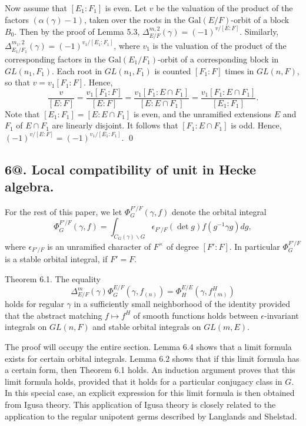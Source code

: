 \documentclass{amsart}
\begin{document}
Now assume that $[E_1:F_1]$ is even.  Let $v$ be the valuation of
the product of the factors $(\alpha(\gamma)-1)$, taken over the
roots in the $\text{Gal}(E/F)$-orbit of a block $B_0$.  Then by the
proof of Lemma 5.3, $\Delta^{m,2}_{E/F}(\gamma) = (-1)^{v/[E:F]}$.
Similarly, $\Delta^{m_1,2}_{E_1/F_1}(\gamma) = (-1)^{v_1/[E_1:F_1]}$,
where $v_1$ is the valuation of the product of the corresponding
factors in the $\text{Gal}(E_1/F_1)$-orbit of a corresponding
block in $GL(n_1,F_1)$.  Each root in $GL(n_1,F_1)$ is counted
$[F_1:F]$ times in $GL(n,F)$, so that $v=v_1[F_1:F]$.
Hence,
$$\frac v {[E:F]} = \frac {v_1[F_1:F]}{[E:F]} =
   \frac {v_1[F_1:E\cap F_1]}{[E:E\cap F_1]} =
   \frac {v_1[F_1:E\cap F_1]}{[E_1:F_1]}.$$
Note that $[E_1:F_1]=[E:E\cap F_1]$  is even, and the unramified
extensions $E$ and $F_1$ of $E\cap F_1$ are linearly disjoint.
It follows that $[F_1:E\cap F_1]$ is odd.  Hence,
$(-1)^{v/[E:F]} = (-1)^{v_1/[E_1:F_1]}$.
\qed
\finishpproclaim

\subsection{{\bf 6@.  Local compatibility of unit in Hecke algebra.}}

\medskip
\noindent

For the rest of this paper, we let 
  $ \Phi_G^{F'\!/F}(\gamma,f)$
denote the orbital integral
%
$$
  \Phi_G^{F'\!/F}
  (\gamma,f) =
  \int_{ C_G(\gamma) \backslash G }
  \epsilon_{F'\!/F}
  (\det g) f (g^{-1} \gamma g) dg,
$$
%
where
  $ \epsilon_{F'\!/F} $
is an unramified character of $F^\times$ of degree
  $ [F':F] $.
In particular
  $ \Phi_{G}^{F'\!/F}$
is a stable orbital integral, if $F'=F$.


\medskip
\noindent
\proclaim Theorem {6.1}.
The equality
%
$$
  \Delta_{E/F}^m 
  (\gamma) \Phi_G^{E/F}
  (\gamma, f_{(n)}) =
  \Phi_H^{E/E} (\gamma, f^H_{(m)} )
$$
%
holds for regular
  $ \gamma $
in a sufficiently small neighborhood of the identity provided
  that the abstract matching
  $ f \mapsto f^H $
of smooth functions holds between
  $ \epsilon $-invariant integrals on
  $ GL(n,F) $
and stable orbital integrals on 
  $ GL(m,E) $.
\finishproclaim

The proof will occupy the entire section.  Lemma 6.4 shows that a limit formula
exists for certain orbital integrals.  Lemma 6.2 shows that if this limit formula has
a certain form, then Theorem 6.1 holds.  An induction argument proves that this
limit formula holds, provided that it holds for a particular conjugacy class in $G$.
In this special case, an explicit expression for this limit
formula is then obtained from Igusa theory.  This application of Igusa theory 
is closely related to the application to the regular unipotent germs described
by Langlands and Shelstad.  
\end{document}
